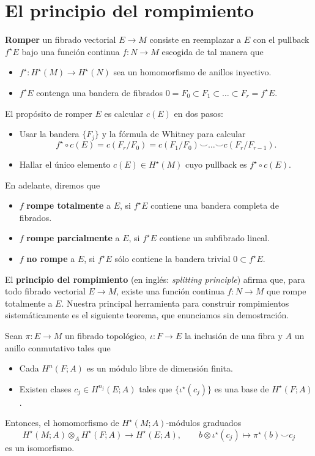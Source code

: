 \section{El principio del rompimiento}

\textbf{Romper} un fibrado vectorial $E \to M$ consiste en reemplazar a $E$ con el pullback $f^\star E$ bajo una función continua $f : N \to M$ escogida de tal manera que
\begin{itemize}
    \itemsep 0em
    \item $f^\star : H^\star(M) \to H^\star(N)$ sea un homomorfismo de anillos inyectivo.
    \item $f^\star E$ contenga una bandera de fibrados $0 = F_0 \subset F_1 \subset \dots \subset F_r = f^\star E$.
\end{itemize}
El propósito de romper $E$ es calcular $c(E)$ en dos pasos:
\begin{itemize}
    \itemsep 0em
    \item Usar la bandera $\{ F_j \}$ y la fórmula de Whitney para calcular
    $$f^\star \circ c(E) = c(F_r / F_0) = c(F_1 / F_0) \smile \dots \smile c(F_r / F_{r-1}).$$
    
    \item Hallar el único elemento $c(E) \in H^\star(M)$ cuyo pullback es $f^\star \circ c(E)$.
\end{itemize}
En adelante, diremos que
\begin{itemize}
    \itemsep 0em
    \item $f$ \textbf{rompe totalmente} a $E$, si $f^\star E$ contiene una bandera completa de fibrados.
    \item $f$ \textbf{rompe parcialmente} a $E$, si $f^\star E$ contiene un subfibrado lineal.
    \item $f$ \textbf{no rompe} a $E$, si $f^\star E$ sólo contiene la bandera trivial $0 \subset f^\star E$.
\end{itemize}

El \textbf{principio del rompimiento} (en inglés: \textit{splitting principle}) afirma que, para todo fibrado vectorial $E \to M$, existe una función continua $f : N \to M$ que rompe totalmente a $E$. Nuestra principal herramienta para construir rompimientos sistemáticamente es el siguiente teorema, que enunciamos sin demostración.

\begin{theorem}
Sean $\pi : E \to M$ un fibrado topológico, $\iota : F \to E$ la inclusión de una fibra y $A$ un anillo conmutativo tales que
\begin{itemize}
    \itemsep 0em
    \item Cada $H^n(F; A)$ es un módulo libre de dimensión finita.
    \item Existen clases $c_j \in H^{n_j}(E; A)$ tales que $\{ \iota^\star(c_j) \}$ es una base de $H^\star(F; A)$.
\end{itemize}
Entonces, el homomorfismo de $H^\star(M; A)$-módulos graduados
$$
H^\star(M; A) \otimes_A H^\star(F; A) \longrightarrow H^\star(E; A), \qquad
b \otimes \iota^\star(c_j) \longmapsto \pi^\star(b) \smile c_j
$$
es un isomorfismo.
\end{theorem}

